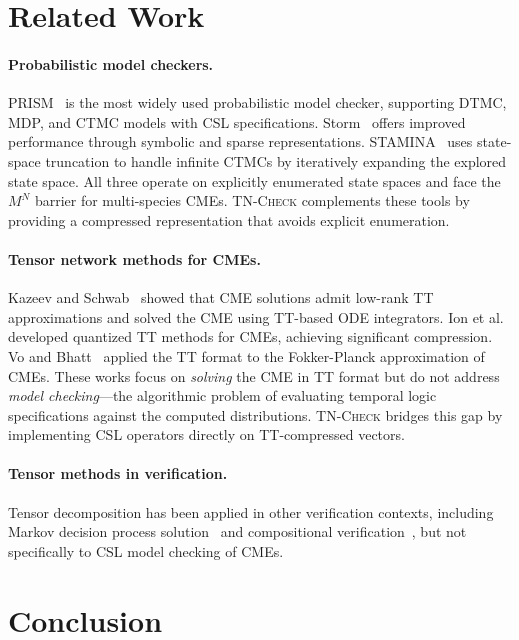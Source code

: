 \documentclass[11pt]{article}
\newcommand{\tncheck}{\textsc{TN-Check}}
\begin{document}
\section{Related Work}\label{sec:related}

\paragraph{Probabilistic model checkers.}
PRISM~\cite{kwiatkowska2011} is the most widely used probabilistic
model checker, supporting DTMC, MDP, and CTMC models with CSL
specifications.
Storm~\cite{hensel2022} offers improved performance through
symbolic and sparse representations.
STAMINA~\cite{neupane2019} uses state-space truncation to handle
infinite CTMCs by iteratively expanding the explored state space.
All three operate on explicitly enumerated state spaces and face
the $M^N$ barrier for multi-species CMEs.
\tncheck{} complements these tools by providing a compressed
representation that avoids explicit enumeration.

\paragraph{Tensor network methods for CMEs.}
Kazeev and Schwab~\cite{kazeev2014} showed that CME solutions
admit low-rank TT approximations and solved the CME using
TT-based ODE integrators.
Ion et al.~\cite{ion2021} developed quantized TT methods
for CMEs, achieving significant compression.
Vo and Bhatt~\cite{vo2017} applied the TT format to
the Fokker-Planck approximation of CMEs.
These works focus on \emph{solving} the CME in TT format but do not
address \emph{model checking}---the algorithmic problem of evaluating
temporal logic specifications against the computed distributions.
\tncheck{} bridges this gap by implementing CSL operators directly
on TT-compressed vectors.

\paragraph{Tensor methods in verification.}
Tensor decomposition has been applied in other verification contexts,
including Markov decision process solution~\cite{buchholz2000} and
compositional verification~\cite{etessami2009}, but not specifically
to CSL model checking of CMEs.

\section{Conclusion}\label{sec:conclusion}
\end{document}
